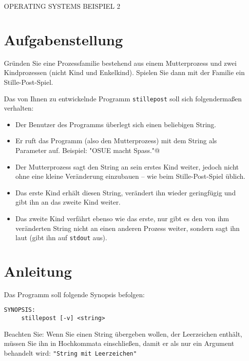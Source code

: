\documentclass{article}
\begin{document}
\begin{center}
\begin{Large}
OPERATING SYSTEMS BEISPIEL 2
\end{Large}
\end{center}




\section*{Aufgabenstellung}

Gründen Sie eine Prozessfamilie bestehend aus einem Mutterprozess und
zwei Kindprozessen (nicht Kind und Enkelkind). Spielen Sie dann mit
der Familie ein Stille-Post-Spiel.

Das von Ihnen zu entwickelnde Programm {\tt stillepost} soll sich
folgendermaßen verhalten:

\begin{itemize}
\item Der Benutzer des Programms überlegt sich einen beliebigen
String.
\item Er ruft das Programm (also den Mutterprozess) mit dem String als
Parameter auf. Beispiel:
\verb@stillepost "OSUE macht Spass."@
\item Der Mutterprozess sagt den String an sein erstes Kind weiter,
jedoch nicht ohne eine kleine Veränderung einzubauen – wie beim
Stille-Post-Spiel üblich.
\item Das erste Kind erhält diesen String, verändert ihn wieder
geringfügig und gibt ihn an das zweite Kind weiter.
\item Das zweite Kind verfährt ebenso wie das erste, nur gibt es den
von ihm veränderten String nicht an einen anderen Prozess weiter,
sondern sagt ihn laut (gibt ihn auf {\tt stdout} aus).
\end{itemize}





\section*{Anleitung}

Das Programm soll folgende Synopsis befolgen:
\begin{verbatim}
SYNOPSIS:
     stillepost [-v] <string>
\end{verbatim}

Beachten Sie: Wenn Sie einen String übergeben wollen, der Leerzeichen
enthält, müssen Sie ihn in Hochkommata einschließen, damit er als
nur ein Argument behandelt wird: \verb_"String mit Leerzeichen"_
\end{document}
